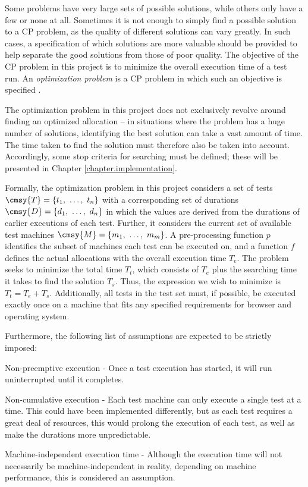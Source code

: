 Some problems have very large sets of possible solutions, while others only have a few or none at all. Sometimes it is not enough to simply find a possible solution to a CP problem, as the quality of different solutions can vary greatly. In such cases, a specification of which solutions are more valuable should be provided to help separate the good solutions from those of poor quality. The objective of the CP problem in this project is to minimize the overall execution time of a test run. An \emph{optimization problem} is a CP problem in which such an objective is specified \cite{MortensBok}.

The optimization problem in this project does not exclusively revolve around finding an optimized allocation -- in situations where the problem has a huge number of solutions, identifying the best solution can take a vast amount of time. The time taken to find the solution must therefore also be taken into account. Accordingly, some stop criteria for searching must be defined; these will be presented in Chapter \ref{chapter.implementation}.

Formally, the optimization problem in this project considers a set of tests $\cmsy{T} = \{t_{1},\ \dots,\ t_{n}\}$ with a corresponding set of durations $\cmsy{D} = \{d_{1},\ \dots,\ d_{n}\}$ in which the values are derived from the durations of earlier executions of each test. Further, it considers the current set of available test machines $\cmsy{M} = \{m_{1},\ \dots,\ m_{m}\}$. A pre-processing function $p$ identifies the subset of machines each test can be executed on, and a function $f$ defines the actual allocations with the overall execution time $T_{e}$. The problem seeks to minimize the total time $T_{t}$, which consists of $T_{e}$ plus the searching time it takes to find the solution $T_{s}$. Thus, the expression we wish to minimize is $T_{t} = T_{e} + T_{s}$. Additionally, all tests in the test set must, if possible, be executed exactly once on a machine that fits any specified requirements for browser and operating system.

Furthermore, the following list of assumptions are expected to be strictly imposed:

\begin{Description}
    \item[Non-preemptive execution]- Once a test execution has started, it will run uninterrupted until it completes.
    \item[Non-cumulative execution]- Each test machine can only execute a single test at a time. This could have been implemented differently, but as each test requires a great deal of resources, this would prolong the execution of each test, as well as make the durations more unpredictable.
    \item[Machine-independent execution time]- Although the execution time will not necessarily be machine-independent in reality, depending on machine performance, this is considered an assumption.
\end{Description}

